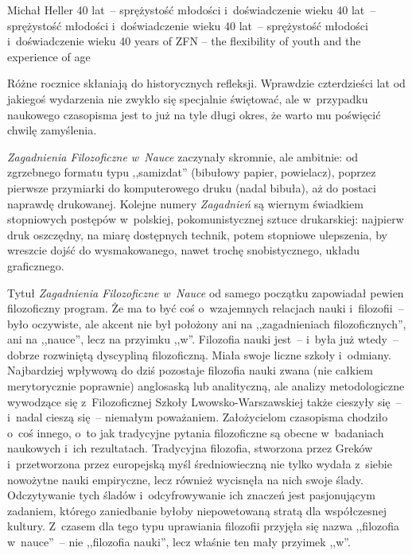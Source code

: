 \begin{editorial}{Michał Heller}
	{40 lat~-- sprężystość młodości i~doświadczenie wieku}
	{40 lat~-- sprężystość młodości i~doświadczenie wieku}
	{40 lat~-- sprężystość młodości i~doświadczenie wieku}
	{40 years of ZFN – the flexibility of youth and the experience of age}




\lettrine[loversize=0.13,lines=2,lraise=-0.03,nindent=0em,findent=0.2pt]%
{R}{}óżne rocznice skłaniają do historycznych refleksji. Wprawdzie czterdzieści lat od jakiegoś wydarzenia nie zwykło
się specjalnie świętować, ale w~przypadku naukowego czasopisma jest to już na tyle długi okres, że warto mu poświęcić
chwilę zamyślenia.

\textit{Zagadnienia Filozoficzne w~Nauce} zaczynały skromnie, ale ambitnie: od zgrzebnego formatu typu ,,samizdat''
(bibułowy papier, powielacz), poprzez pierwsze przymiarki do komputerowego druku (nadal bibuła), aż do postaci naprawdę
drukowanej. Kolejne numery \textit{Zagadnień} są wiernym świadkiem stopniowych postępów w~polskiej, pokomunistycznej
sztuce drukarskiej: najpierw druk oszczędny, na miarę dostępnych technik, potem stopniowe ulepszenia, by wreszcie dojść
do wysmakowanego, nawet trochę snobistycznego, układu graficznego.

Tytuł \textit{Zagadnienia Filozoficzne w~Nauce} od samego początku zapowiadał pewien filozoficzny program. Że ma to
być coś o~wzajemnych relacjach nauki i~filozofii~-- było oczywiste, ale akcent nie był położony ani na ,,zagadnieniach
filozoficznych'', ani na ,,nauce'', lecz na przyimku ,,w''. Filozofia nauki jest~-- i~była już wtedy~-- dobrze rozwiniętą
dyscypliną filozoficzną. Miała swoje liczne szkoły i~odmiany. Najbardziej wpływową do dziś pozostaje filozofia nauki
zwana (nie całkiem merytorycznie poprawnie) anglosaską lub analityczną, ale analizy metodologiczne wywodzące się z~Filozoficznej
Szkoły Lwowsko-Warszawskiej także cieszyły się~-- i~nadal cieszą się~-- niemałym poważaniem. Założycielom
czasopisma chodziło o~coś innego, o~to jak tradycyjne pytania filozoficzne są obecne w~badaniach naukowych i~ich
rezultatach. Tradycyjna filozofia, stworzona przez Greków i~przetworzona przez europejską myśl średniowieczną nie tylko
wydała z~siebie nowożytne nauki empiryczne, lecz również wycisnęła na nich swoje ślady. Odczytywanie tych śladów i~odcyfrowywanie
ich znaczeń jest pasjonującym zadaniem, którego zaniedbanie byłoby niepowetowaną stratą dla współczesnej
kultury. Z~czasem dla tego typu uprawiania filozofii przyjęła się nazwa ,,filozofia w~nauce''~-- nie ,,filozofia nauki'',
lecz właśnie ten mały przyimek ,,w''.


\end{editorial}
